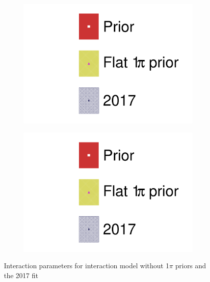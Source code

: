 \begin{figure}[h]
	\begin{subfigure}[t]{0.49\textwidth}
		\includegraphics[width=\textwidth, trim={0mm 0mm 0mm 0mm}, clip,page=20]{figures/mach3/data/alt/2017b_FlatPion_Data_merg_2017b_NewData_NewDet_UpdXsecStep_2Xsec_4Det_5Flux_0.pdf}
	\end{subfigure}
	\begin{subfigure}[t]{0.49\textwidth}
		\includegraphics[width=\textwidth, trim={0mm 0mm 0mm 0mm}, clip,page=21]{figures/mach3/data/alt/2017b_FlatPion_Data_merg_2017b_NewData_NewDet_UpdXsecStep_2Xsec_4Det_5Flux_0.pdf}
	\end{subfigure}
	\caption{Interaction parameters for interaction model without 1$\pi$ priors and the 2017 fit}
	\label{fig:1pi_prior_xsec}
\end{figure}

